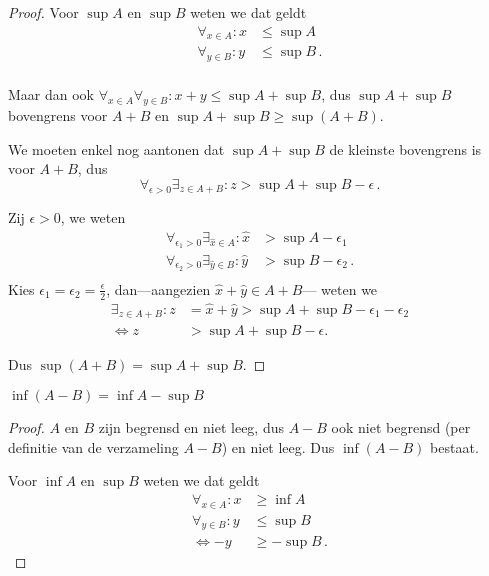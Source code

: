 \documentclass[week=1]{homework}
\begin{document}
\begin{questions}
\begin{parts}
\begin{proof}
	        		Voor $\sup A$ en $\sup B$ weten we dat geldt
	        		\begin{align*}
	        			\forall_{x \in A}: x &\leq \sup A \\
	        			\forall_{y \in B}: y &\leq \sup B\,. \\
	        		\end{align*}
	        		
	        		Maar dan ook $\forall_{x\in A}\forall_{y \in B}: x + y \leq \sup A + \sup B$, dus $\sup A + \sup B$ bovengrens voor $A+B$ en $\sup A + \sup B \geq \sup(A+B)$. 
	        		
	        		We moeten enkel nog aantonen dat $\sup A + \sup B$ de kleinste bovengrens is voor $A+B$, dus
	        		\[
		        		\forall_{\epsilon > 0}\exists_{z \in A+B}: z > \sup A + \sup B - \epsilon\,.
	        		\]
	        		
	        		Zij $\epsilon > 0$, we weten
	        		\begin{align*}
	        			\forall_{\epsilon_1 > 0}\exists_{\hat x \in A}: \hat x &> \sup A - \epsilon_1 \\
	        			\forall_{\epsilon_2 > 0}\exists_{\hat y \in B}: \hat y &> \sup B - \epsilon_2 \,. \\
	        		\end{align*}
	        		Kies $\epsilon_1 = \epsilon_2 = \frac{\epsilon}{2}$, dan---aangezien $\hat x + \hat y \in A+B$--- weten we
			        \begin{align*}
			        	\exists_{z \in A+B}: z &= \hat x + \hat y > \sup A + \sup B - \epsilon_1 - \epsilon_2 \\
			        	\Leftrightarrow z &> \sup A + \sup B - \epsilon.
			        \end{align*}
			        
			        Dus $\sup (A+B) = \sup A + \sup B$.
	        	\end{proof}
        	
	        	\begin{toprove}
	        		$\inf (A-B) = \inf A - \sup B$
	        	\end{toprove}
	        	\begin{proof}
	        		$A$ en $B$ zijn begrensd en niet leeg, dus $A-B$ ook niet begrensd (per definitie van de verzameling $A-B$) en niet leeg. Dus $\inf(A-B)$ bestaat.
	        		
	        		Voor $\inf A$ en $\sup B$ weten we dat geldt
	        		\begin{align*}
	        		\forall_{x \in A}: x &\geq \inf A \\
	        		\forall_{y \in B}: y &\leq \sup B \\
	        		\Leftrightarrow -y &\geq -\sup B\,.
	        		\end{align*}
	        		

\end{proof}
\end{parts}
\end{questions}
\end{document}
